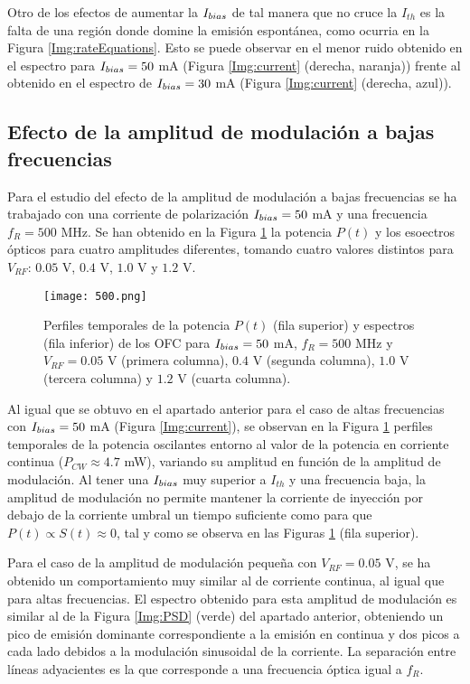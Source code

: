 		Otro de los efectos de aumentar la $I_{bias}$ de tal manera que no cruce la $I_{th}$ es la falta de una regi\'on donde domine la emisi\'on espont\'anea, como ocurria en la Figura \ref{Img:rateEquations}. Esto se puede observar en el menor ruido obtenido en el espectro para $I_{bias} = 50$ mA (Figura \ref{Img:current} (derecha, naranja)) frente al obtenido en el espectro de $I_{bias} = 30$ mA (Figura \ref{Img:current} (derecha, azul)).

	\subsection{Efecto de la amplitud de modulación a bajas frecuencias}
		\label{Sol:OFC:LwFreq}

		Para el estudio del efecto de la amplitud de modulación a bajas frecuencias se ha trabajado con una corriente de polarización $I_{bias} = 50$ mA y una frecuencia $f_R = 500$ MHz. Se han obtenido en la Figura \ref{Img:500} la potencia $P(t)$ y los esoectros ópticos para cuatro amplitudes diferentes, tomando cuatro valores distintos para $V_{RF}$: $0.05$ V, $0.4$ V, $1.0$ V y $1.2$ V.

			\begin{figure}[H]
				\centering
				\texttt{[image: 500.png]}
				\vspace{-0.5cm}
				\caption{\label{Img:500}Perfiles temporales de la potencia $P(t)$ (fila superior) y espectros (fila inferior) de los OFC para $I_{bias} = 50$ mA, $f_R = 500$ MHz y $V_{RF} = 0.05$ V (primera columna), $0.4$ V (segunda columna), $1.0$ V (tercera columna) y $1.2$ V (cuarta columna).}	
			\end{figure}

		Al igual que se obtuvo en el apartado anterior para el caso de altas frecuencias con $I_{bias} = 50$ mA (Figura \ref{Img:current}), se observan en la Figura \ref{Img:500} perfiles temporales de la potencia oscilantes entorno al valor de la potencia en corriente continua ($P_{CW} \approx 4.7$ mW), variando su amplitud en funci\'on de la amplitud de modulación. Al tener una $I_{bias}$ muy superior a $I_{th}$ y una frecuencia baja, la amplitud de modulaci\'on no permite mantener la corriente de inyecci\'on por debajo de la corriente umbral un tiempo suficiente como para que $P(t) \propto S(t) \approx 0$, tal y como se observa en las Figuras \ref{Img:500} (fila superior).

		Para el caso de la amplitud de modulaci\'on pequeña con $V_{RF} = 0.05$ V, se ha obtenido un comportamiento muy similar al de corriente continua, al igual que para altas frecuencias. El espectro obtenido para esta amplitud de modulaci\'on es similar al de la Figura \ref{Img:PSD} (verde) del apartado anterior, obteniendo un pico de emisi\'on dominante correspondiente a la emisi\'on en continua y dos picos a cada lado debidos a la modulación sinusoidal de la corriente. La separación entre líneas adyacientes es la que corresponde a una frecuencia óptica igual a $f_R$.

